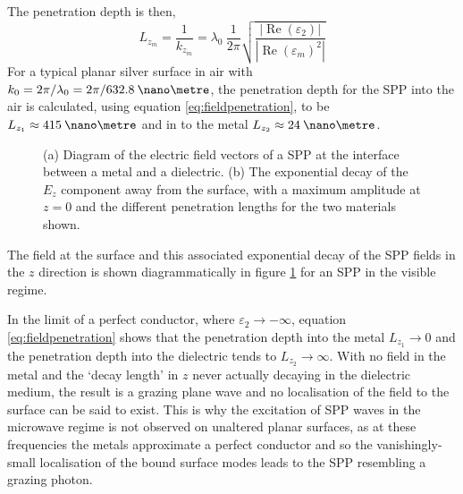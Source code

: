 The penetration depth is then,
\begin{equation}
L_{z_m}=\frac{1}{k_{z_m}}=\lambda_0\:\frac{1}{2\pi}\sqrt{\frac{|\operatorname{Re}(\varepsilon_2)|}{|\operatorname{Re}(\varepsilon_m)^2|}}\label{eq:fieldpenetration}
\end{equation}
For a typical planar silver surface in air with  $k_0=2\pi/\lambda_0=2\pi/632.8\:\nano\metre$, the penetration depth for the SPP into the air is calculated, using equation \ref{eq:fieldpenetration}, to be $L_{z_1}\approx 415\:\nano\metre$ and in to the metal $L_{z_2}\approx 24\:\nano\metre$.
\begin{figure}
\begin{center}
\subfigure[]{}
\subfigure[]{}
\caption[Diagram of the electric field vectors of a SPP at the interface between a metal and a dielectric and the exponential decay of the $E_z$ component away from the surface.]{(a) Diagram of the electric field vectors of a SPP at the interface between a metal and a dielectric. (b) The exponential decay of the $E_z$ component away from the surface, with a maximum amplitude at $z=0$ and the different penetration lengths for the two materials shown. \label{fig:fieldlinescartoon}}
\end{center}
\end{figure}
The field at the surface and this associated exponential decay of the SPP fields in the $z$ direction is shown diagrammatically in figure \ref{fig:fieldlinescartoon} for an SPP in the visible regime. 

In the limit of a perfect conductor, where $\varepsilon_2 \rightarrow -\infty$, equation \ref{eq:fieldpenetration} shows that the penetration depth into the metal $L_{z_1}\rightarrow 0$ and the penetration depth into the dielectric tends to $L_{z_2}\rightarrow \infty$. With no field in the metal and the `decay length' in $z$ never actually decaying in the dielectric medium, the result is a grazing plane wave and no localisation of the field to the surface can be said to exist. This is why the excitation of SPP waves in the microwave regime is not observed on unaltered planar surfaces, as at these frequencies the metals approximate a perfect conductor and so the vanishingly-small localisation of the bound surface modes leads to the SPP resembling a grazing photon. 


